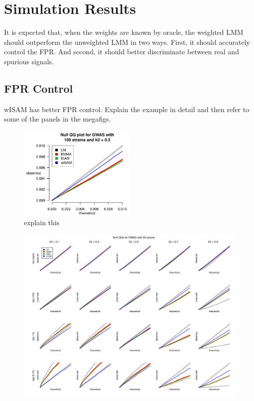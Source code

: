 \newpage
\section{Simulation Results}

It is expected that, when the weights are known by oracle, the weighted LMM should outperform the unweighted LMM in two ways.
First, it should accurately control the FPR.
And second, it should better discriminate between real and spurious signals.


\subsection{FPR Control}

wISAM has better FPR control.  Explain the example in detail and then refer to some of the panels in the megafigs.

\begin{figure}
  \centering
  \includegraphics[width = 0.5\textwidth]{images/exampleQQ.pdf}
  \caption{explain this}
  \label{fig:exampleQQ}
\end{figure}

\begin{figure}
  \includegraphics[width = \textwidth]{images/2018-05-19alt_heterosked_sims_nstrain=50_nsnps=100_nsims=10000.pdf}
\end{figure}

